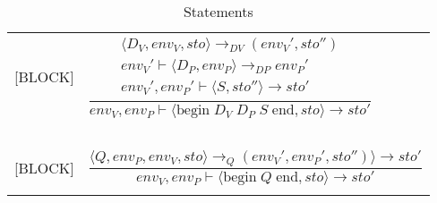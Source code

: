 \begin{longtable}{l l}
[BLOCK] & $\dfrac{\begin{matrix} \langle D_V, env_V, sto \rangle \rightarrow_{DV} (env_V', sto'') \\ env_V' \vdash \langle D_P, env_P \rangle \rightarrow_{DP} env_P' \\ env_V', env_P' \vdash \langle S, sto'' \rangle \rightarrow sto' \end{matrix}}{env_V, env_P \vdash \langle \text{begin} \; D_V \; D_P \; S \; \text{end}, sto \rangle \rightarrow sto' }$ \\
~ & ~ \\

[BLOCK] & $\dfrac{\langle Q, env_P, env_V, sto \rangle \rightarrow_{Q} (env_V', env_P', sto'') \rangle \rightarrow sto'}{env_V, env_P \vdash \langle \text{begin} \; Q \; \text{end}, sto \rangle \rightarrow sto' }$ \\
\caption{Statements}
\end{longtable}
